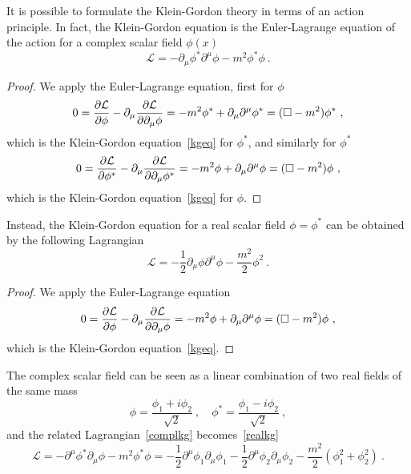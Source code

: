     It is possible to formulate the Klein-Gordon theory in terms of an action principle. In fact, the Klein-Gordon equation is the Euler-Lagrange equation of the action for a complex scalar field $\phi(x)$
    \begin{equation}\label{complkg}
        \mathcal L = - \partial_\mu \phi^* \partial^\mu \phi - m^2 \phi^* \phi ~.
    \end{equation}
    \begin{proof}
        We apply the Euler-Lagrange equation, first for $\phi$
        \begin{equation*}
            0 = \frac{\partial\mathcal L}{\partial\phi} - \partial_\mu \frac{\partial\mathcal L}{\partial\partial_\mu \phi} = - m^2 \phi^* + \partial_\mu \partial^\mu \phi^* = (\Box - m^2) \phi^* ~,
        \end{equation*}
            which is the Klein-Gordon equation~\eqref{kgeq} for $\phi^*$, and similarly for $\phi^*$ 
        \begin{equation*}
            0 = \frac{\partial\mathcal L}{\partial\phi^*} - \partial_\mu \frac{\partial\mathcal L}{\partial\partial_\mu \phi^*} = - m^2 \phi + \partial_\mu \partial^\mu \phi = (\Box - m^2) \phi ~,
        \end{equation*}
        which is the Klein-Gordon equation~\eqref{kgeq} for $\phi$.
    \end{proof}

    Instead, the Klein-Gordon equation for a real scalar field $\phi = \phi^*$ can be obtained by the following Lagrangian
    \begin{equation}\label{realkg}
        \mathcal L = - \frac{1}{2} \partial_\mu \phi \partial^\mu \phi - \frac{m^2}{2} \phi^2 ~.
    \end{equation}

    \begin{proof}
        We apply the Euler-Lagrange equation
        \begin{equation*}
            0 = \frac{\partial\mathcal L}{\partial\phi} - \partial_\mu \frac{\partial\mathcal L}{\partial\partial_\mu \phi} = - m^2 \phi + \partial_\mu \partial^\mu \phi = (\Box - m^2) \phi ~,
        \end{equation*}
        which is the Klein-Gordon equation~\eqref{kgeq}.
    \end{proof}

    The complex scalar field can be seen as a linear combination of two real fields of the same mass 
    \begin{equation*}
        \phi = \frac{\phi_1 + i \phi_2}{\sqrt{2}} ~, \quad \phi^* = \frac{\phi_1 - i \phi_2}{\sqrt{2}} ~,
    \end{equation*}
    and the related Lagrangian~\eqref{complkg} becomes~\eqref{realkg}
    \begin{equation*}
        \mathcal L = - \partial^\mu \phi^* \partial_\mu \phi - m^2 \phi^* \phi = -\frac{1}{2} \partial^\mu \phi_1 \partial_\mu \phi_1 - \frac{1}{2} \partial^\mu \phi_2 \partial_\mu \phi_2 - \frac{m^2}{2} (\phi_1^2 + \phi^2_2)  ~.
    \end{equation*}

